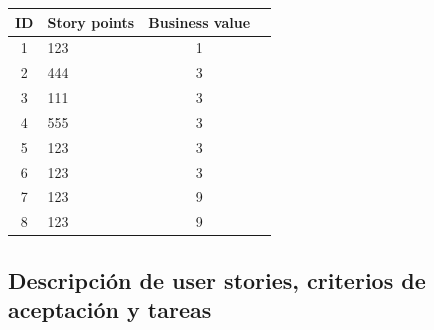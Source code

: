 \documentclass[a4paper, 10pt, twoside]{article}
\begin{document}
\begin{center}
\begin{tabular}{|c|l|c|c|}
\hline
ID & Story points & Business value\\
\hline
1 & 123 & 1\\
2 & 444 & 3\\
3 & 111 & 3\\
4 & 555 & 3\\
5 & 123 & 3\\
6 & 123 & 3\\
7 & 123 & 9\\
8 & 123 & 9\\
\hline
\end{tabular}
\end{center}


\subsection{Descripción de user stories, criterios de aceptación y tareas}
\end{document}
